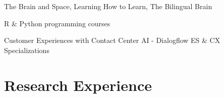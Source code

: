 \documentclass[letterpaper]{deedy-resume} %
\begin{document}
\sectionspace %
\vspace{\topsep} %
\begin{tightitemize}
\item The Brain and Space, Learning How to Learn, The Bilingual Brain
\item R \& Python programming courses
\item Customer Experiences with Contact Center AI - Dialogflow ES \& CX Specializations
\end{tightitemize}
\sectionspace %

\section{Research Experience}
\end{document}
